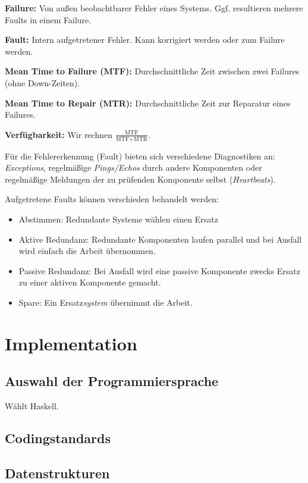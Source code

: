 \documentclass{panikzettel}
\begin{document}
\textbf{Failure:} Von außen beobachtbarer Fehler eines Systems.
Ggf. resultieren mehrere Faults in einem Failure.

\textbf{Fault:} Intern aufgetretener Fehler.
Kann korrigiert werden oder zum Failure werden.

\textbf{Mean Time to Failure (MTF):} Durchschnittliche Zeit zwischen zwei Failures (ohne Down-Zeiten).

\textbf{Mean Time to Repair (MTR):} Durchschnittliche Zeit zur Reparatur eines Failures.

\textbf{Verfügbarkeit:} Wir rechnen $\frac{\textrm{MTF}}{\textrm{MTF}+\textrm{MTR}}$.

Für die Fehlererkennung (Fault) bieten sich verschiedene Diagnostiken an: \emph{Exceptions}, regelmäßige \emph{Pings/Echos} durch andere Komponenten oder regelmäßige Meldungen der zu prüfenden Komponente selbst (\emph{Heartbeats}).

Aufgetretene Faults können verschieden behandelt werden:
\begin{itemize}
  \item Abstimmen: Redundante Systeme wählen einen Ersatz
  \item Aktive Redundanz: Redundante Komponenten laufen parallel und bei Ausfall wird einfach die Arbeit übernommen.
  \item Passive Redundanz: Bei Ausfall wird eine passive Komponente zwecks Ersatz zu einer aktiven Komponente gemacht.
  \item Spare: Ein Ersatz\emph{system} übernimmt die Arbeit.
\end{itemize}

\section{Implementation}

\subsection{Auswahl der Programmiersprache}

Wählt Haskell.

\subsection{Codingstandards}


\subsection{Datenstrukturen}
\end{document}

